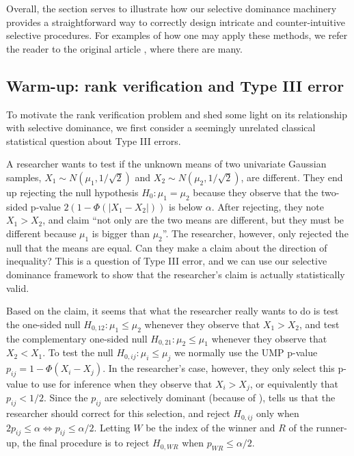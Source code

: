 \documentclass{article}
\begin{document}
Overall, the section serves to illustrate how our selective dominance machinery provides a straightforward way to correctly design intricate and counter-intuitive selective procedures. For examples of how one may apply these methods, we refer the reader to the original article \cite{Hung2019}, where there are many. 

\subsection{Warm-up: rank verification and Type III error}

To motivate the rank verification problem and shed some light on its relationship with selective dominance, we first consider a seemingly unrelated classical statistical question about Type III errors. 

A researcher wants to test if the unknown means of two univariate Gaussian samples, $X_1 \sim N(\mu_1, 1/\sqrt{2})$ and $X_2 \sim N(\mu_2, 1/\sqrt{2})$, are different. They end up rejecting the null hypothesis $H_0: \mu_1 = \mu_2$ because they observe that the two-sided p-value $2(1 - \Phi(|X_1 - X_2|))$ is below $\alpha$. After rejecting, they note $X_1 > X_2$, and claim ``not only are the two means are different, but they must be different because $\mu_1$ is bigger than $\mu_2$''. The researcher, however, only rejected the null that the means are equal. Can they make a claim about the direction of inequality? This is a question of Type III error, and we can use our selective dominance framework to show that the researcher's claim is actually statistically valid. 

Based on the claim, it seems that what the researcher really wants to do is test the one-sided null $H_{0, 12} : \mu_1 \leq \mu_2$ whenever they observe that $X_1 > X_2$, and test the complementary one-sided null $H_{0, 21} : \mu_2 \leq \mu_1$ whenever they observe that $X_2 < X_1$. To test the null $H_{0, ij} : \mu_i \leq \mu_j$ we normally use the UMP p-value $p_{ij} = 1 - \Phi(X_i - X_j)$. In the researcher's case, however, they only select this p-value to use for inference when they observe that $X_i > X_{j}$, or equivalently that $p_{ij} < 1/2$. Since the $p_{ij}$ are selectively dominant (because of ),  tells us that the researcher should correct for this selection, and reject $H_{0, ij}$ only when $2p_{ij} \leq \alpha \iff p_{ij} \leq \alpha/2$. Letting $W$ be the index of the winner and $R$ of the runner-up, the final procedure is to reject $H_{0, WR}$ when $p_{WR} \leq \alpha/2$. 
\end{document}
